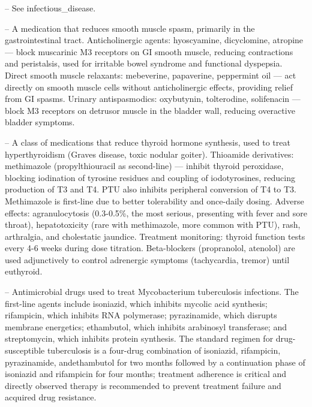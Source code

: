 -- See infectious\_disease.

-- A medication that reduces smooth muscle spasm, primarily in the gastrointestinal tract. Anticholinergic agents: hyoscyamine, dicyclomine, atropine — block muscarinic M3 receptors on GI smooth muscle, reducing contractions and peristalsis, used for irritable bowel syndrome and functional dyspepsia. Direct smooth muscle relaxants: mebeverine, papaverine, peppermint oil — act directly on smooth muscle cells without anticholinergic effects, providing relief from GI spasms. Urinary antispasmodics: oxybutynin, tolterodine, solifenacin — block M3 receptors on detrusor muscle in the bladder wall, reducing overactive bladder symptoms.

-- A class of medications that reduce thyroid hormone synthesis, used to treat hyperthyroidism (Graves disease, toxic nodular goiter). Thioamide derivatives: methimazole (propylthiouracil as second-line) — inhibit thyroid peroxidase, blocking iodination of tyrosine residues and coupling of iodotyrosines, reducing production of T3 and T4. PTU also inhibits peripheral conversion of T4 to T3. Methimazole is first-line due to better tolerability and once-daily dosing. Adverse effects: agranulocytosis (0.3-0.5\%, the most serious, presenting with fever and sore throat), hepatotoxicity (rare with methimazole, more common with PTU), rash, arthralgia, and cholestatic jaundice. Treatment monitoring: thyroid function tests every 4-6 weeks during dose titration. Beta-blockers (propranolol, atenolol) are used adjunctively to control adrenergic symptoms (tachycardia, tremor) until euthyroid.

-- Antimicrobial drugs used to treat Mycobacterium tuberculosis infections. The first-line agents include isoniazid, which inhibits mycolic acid synthesis; rifampicin, which inhibits RNA polymerase; pyrazinamide, which disrupts membrane energetics; ethambutol, which inhibits arabinosyl transferase; and streptomycin, which inhibits protein synthesis. The standard regimen for drug-susceptible tuberculosis is a four-drug combination of isoniazid, rifampicin, pyrazinamide, andethambutol for two months followed by a continuation phase of isoniazid and rifampicin for four months; treatment adherence is critical and directly observed therapy is recommended to prevent treatment failure and acquired drug resistance.

